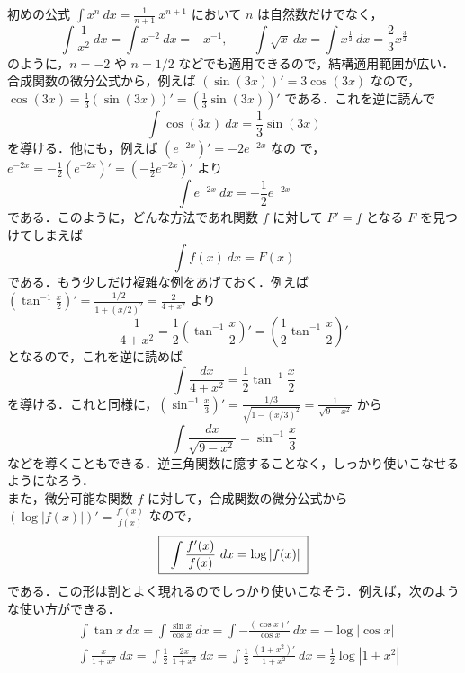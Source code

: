 \documentclass[10pt, uplatex, dvipdfmx]{jsarticle}
\theoremstyle{definition}
\numberwithin{equation}{section}
\newcommand{\ds}{\displaystyle}
\begin{document}
\newpage

初めの公式 $\ds \int x^n \ dx = \frac{1}{n+1}~\! x^{n+1} $ において $n$ は自然数だけでなく，
\[
  \int \frac{1}{x^2} \ dx = \int x^{-2} \ dx = -x^{-1},\qquad
  \int \sqrt{x} \ dx = \int
  x^{\frac{1}{2}} \ dx =\frac{2}{3} x^{\frac{3}{2}}
\]
のように，$n=-2$ や $n=1/2$ などでも適用できるので，結構適用範囲が広い．\\


合成関数の微分公式から，例えば $\left( \sin\left(3x\right)\right)' = 3
\cos(3x)$
なので，$\ds \cos(3x) = \frac{1}{3}\left( \sin (3x)\right)' = \left(
  \frac{1}{3} \sin(3x) \right)'$ である．これを逆に読んで
\[
 \int\cos (3x) \ dx = \frac{1}{3} \sin (3x)
\]
を導ける．他にも，例えば $\left( e^{-2x}\right)' = -2 e^{-2x}$ なの
で，$\ds e^{-2x} = -\frac{1}{2} \left( e^{-2x}\right)' = \left(
-\frac{1}{2} e^{-2x}\right)'$ より
\[
  \int e^{-2x} \ dx = -\frac{1}{2} e^{-2x}
\]
である．このように，どんな方法であれ関数 $f$ に対して $F' = f$ となる $F$ を見つけてしまえば
\[
  \int f(x) \ dx = F(x)
\]
である．もう少しだけ複雑な例をあげておく．例えば
$\ds \left( \tan^{-1} \frac{x}{2}\right)' = \frac{1/2}{1 + \left(x/2\right)^2} = \frac{2}{4+x^2}$ より
\[
  \frac{1}{4+x^2} = \frac{1}{2} \left( \tan^{-1}\frac{x}{2}\right)' = \left( \frac{1}{2}\tan^{-1}\frac{x}{2}\right)'
\]
となるので，これを逆に読めば
\[
  \int \frac{dx}{4+x^2} = \frac{1}{2} \tan^{-1}\frac{x}{2}
\]
を導ける．これと同様に，$\ds \left(\sin^{-1} \frac{x}{3} \right)' =
\frac{1/3}{\sqrt{1-(x/3)^2}}=\frac{1}{\sqrt{9-x^2}}$ から
\[
  \int \frac{dx}{\sqrt{9-x^2}} = \sin^{-1} \frac{x}{3}
\]
などを導くこともできる．逆三角関数に臆することなく，しっかり使いこなせるようになろう．\\

また，微分可能な関数 $f$ に対して，合成関数の微分公式から
$\ds \left(\log | f(x) |\right)' = \frac{f'(x)}{f(x)}$ なので，
\[
  \fbox{\; $\ds \int \frac{f'(x)}{f(x)} \ dx = \log | f(x) |$\;}
\]
である．この形は割とよく現れるのでしっかり使いこなそう．例えば，次のような使い方ができる．
\[
  \begin{aligned}
    &\int \tan x \ dx = \int \frac{\sin x }{\cos x} \ dx = \int  - \frac{\left( \cos x\right)'}{\cos x} \ dx
      = - \log|\cos x| \\ 
    &\int \frac{x}{1+x^2} \ dx = \int \frac{1}{2}~ \frac{2x}{1+x^2} \ dx
      = \int \frac{1}{2}~\frac{(1+x^2)'}{1+x^2} \ dx
      = \frac{1}{2} \log|1+x^2|
  \end{aligned}
\]


\newpage
\end{document}
